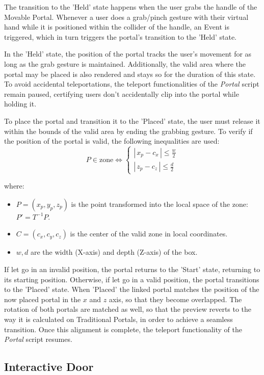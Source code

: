 The transition to the 'Held' state happens when the user grabs the handle of the Movable Portal. Whenever a user does a grab/pinch gesture 
with their virtual hand while it is positioned within the collider of the handle, an Event is triggered, which in
turn triggers the portal's transition to the 'Held' state. 

In the 'Held' state, the position of the portal tracks the user's movement for as long as the grab gesture is maintained. 
Additionally, the valid area where the portal may be placed is also rendered and stays so for the duration of this state.
To avoid accidental teleportations, the teleport functionalities of the \textit{Portal} script remain paused, 
certifying users don't accidentally clip into the portal while holding it.

To place the portal and transition it to the 'Placed' state, the user must release it within the bounds of the valid area by ending the 
grabbing gesture. To verify if the position of the portal is valid, the following inequalities are used:
\[
P \in \text{zone} \iff 
\begin{cases} 
|\,x_p - c_x\,| \le \frac{w}{2} \\[2mm]
|\,z_p - c_z\,| \le \frac{d}{2}
\end{cases}
\]

where:
\begin{itemize}
    \item $P = (x_p, y_p, z_p)$ is the point transformed into the local space of the zone: $P' = T^{-1} P$.
    \item $C = (c_x, c_y, c_z)$ is the center of the valid zone in local coordinates.
    \item $w, d$ are the width (X-axis) and depth (Z-axis) of the box.
\end{itemize}

If let go in an invalid position, the portal returns to the 'Start' state, returning to its starting position. Otherwise, if let go in a valid 
position, the portal transitions to the 'Placed' state. When 'Placed' the linked portal matches the position of the now placed portal in the $x$ and 
$z$ axis, so that they become overlapped. The rotation of both portals are matched as well, so that the preview reverts to the way it is calculated on Traditional 
Portals, in order to achieve a seamless transition. Once this alignment is complete, the teleport functionality of the \textit{Portal} script resumes.

\subsection{Interactive Door}
\label{sec:interactive-door}

